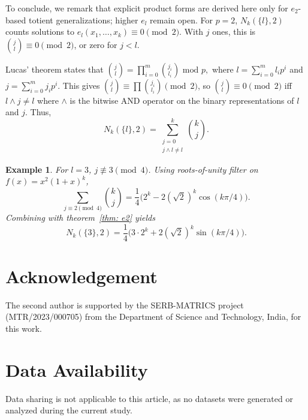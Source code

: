 \documentclass[12pt]{article}
\newtheorem{exmp}{Example}[subsection]%
\begin{document}
To conclude, we remark that explicit product forms are derived here only for $e_2$-based totient generalizations; higher $e_l$ remain open. For $p=2$, $N_k(\{l\},2)$ counts solutions to $e_l(x_1,\dots,x_k)\equiv0\pmod{2}$. With $j$ ones, this is $\binom{j}{l}\equiv0\pmod{2}$, or zero for $j<l$.

Lucas' theorem \cite{lucas1878theorie} states that $
    \binom{j}{l}= \prod_{i=0}^m\binom{j_i}{l_i}\text{ mod }p,
    $
    where $l = \sum_{i=0}^ml_ip^i$ and $j = \sum_{i=0}^mj_ip^i$. This gives $\binom{j}{l}\equiv\prod\binom{j_i}{l_i}\pmod{2}$, so $\binom{j}{l}\equiv0\pmod{2}$ iff $l \wedge j \neq l$ where $\wedge$ is the bitwise AND operator on the binary representations of $l$ and $j$. Thus,
$$
N_k(\{l\},2)=\sum_{\substack{j=0\\j\wedge l\neq l}}^k\binom{k}{j}.
$$

\begin{exmp}
For $l=3$, $j\not\equiv3\pmod{4}$. Using roots-of-unity filter on $f(x)=x^2(1+x)^k$,
$$
\sum_{j\equiv2\pmod{4}}\binom{k}{j}=\frac{1}{4}\bigl(2^k-2(\sqrt{2})^k\cos(k\pi/4)\bigr).
$$
Combining with theorem~\ref{thm: e2} yields
$$
N_k(\{3\},2)=\frac{1}{4}\bigl(3\cdot2^k+2(\sqrt{2})^k\sin(k\pi/4)\bigr).
$$
\end{exmp}

\section*{Acknowledgement} 
The second author is supported by the SERB-MATRICS project (MTR/2023/000705)
from the Department of Science and Technology, India, for this work.

\section*{Data Availability}
Data sharing is not applicable to this article, as no datasets were generated or analyzed during the current study.



\end{document}
